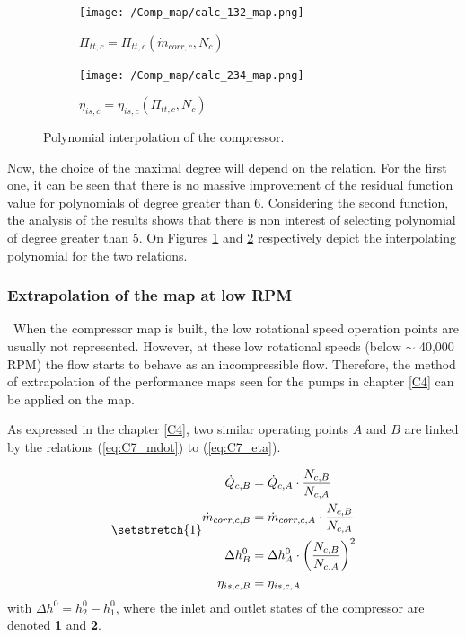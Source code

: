 \begin{figure}[h]
    \centering
    \begin{subfigure}[b]{0.4\textwidth}
        \centering
        \texttt{[image: /Comp\_map/calc\_132\_map.png]}
        \caption{$\Pi_{tt,c} = \Pi_{tt,c}(\dot{m}_{corr,c},N_c)$}
        \label{fig:C7_polycomp1}
    \end{subfigure}
    \begin{subfigure}[b]{0.4\textwidth}
        \centering
        \texttt{[image: /Comp\_map/calc\_234\_map.png]}
        \caption{$\eta_{is,c} = \eta_{is,c}(\Pi_{tt,c},N_c)$}
        \label{fig:C7_polycomp2}
    \end{subfigure}
    \caption{Polynomial interpolation of the compressor.} \label{fig:C7_polycomp}
\end{figure}

Now, the choice of the maximal degree will depend on the relation. For the first one, it can be seen that there is no massive improvement of the residual function value for polynomials of degree greater than 6. Considering the second function, the analysis of the results shows that there is non interest of selecting polynomial of degree greater than 5.
On Figures \ref{fig:C7_polycomp1} and \ref{fig:C7_polycomp2} respectively depict the interpolating polynomial for the two relations.


\subsubsection{Extrapolation of the map at low RPM}
\quad\, When the compressor map is built, the low rotational speed operation points are usually not represented. However, at these low rotational speeds (below $\sim$ 40,000 RPM) the flow starts to behave as an incompressible flow. Therefore, the method of extrapolation of the performance maps seen for the pumps in chapter \ref{C4} can be applied on the map.

As expressed in the chapter \ref{C4}, two similar operating points $A$ and $B$ are linked by the relations (\ref{eq:C7_mdot}) to (\ref{eq:C7_eta}). 

\begin{subequations}
\setstretch{1}
\begin{align}
    \dot{Q}_{c,B} &= \dot{Q}_{c,A} \cdot \frac{N_{c,B}}{N_{c,A}}\nonumber\\
    \dot{m}_{corr,c,B} &= \dot{m}_{corr,c,A} \cdot \frac{N_{c,B}}{N_{c,A}}\label{eq:C7_mdot}\\
    \Delta h_{B}^0 &= \Delta h_{A}^0 \cdot \left(\frac{N_{c,B}}{N_{c,A}}\right)^2 \label{eq:C7_Dh}\\
    \eta_{is,c,B} &= \eta_{is,c,A} \label{eq:C7_eta}
\end{align}
\end{subequations}
with $\Delta h^0 = h_{2}^0 - h_{1}^0$, where the inlet and outlet states of the compressor are denoted \textbf{1} and \textbf{2}.\\


